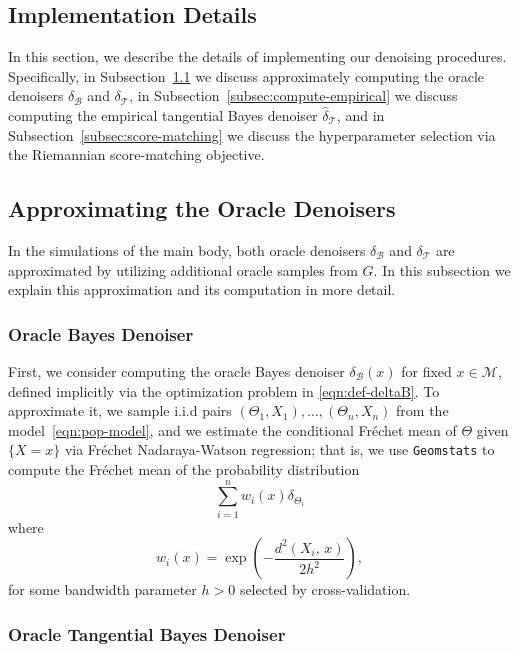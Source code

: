 \documentclass[preprint]{imsart}
\theoremstyle{plain}
\theoremstyle{definition}
\newcommand{\Mcal}{\mathcal{M}}
\newcommand{\B}{\mathcal{B}}
\newcommand{\T}{\mathcal{T}}
\begin{document}
\begin{appendix}
\section{Implementation Details}\label{app:implementation}

In this section, we describe the details of implementing our denoising procedures.
Specifically, in Subsection~\ref{subsec:compute-oracle} we discuss approximately computing the oracle denoisers $\delta_{\B}$ and $\delta_{\T}$, in Subsection~\ref{subsec:compute-empirical} we discuss computing the empirical tangential Bayes denoiser $\hat{\delta}_{\T}$, and in Subsection~\ref{subsec:score-matching} we discuss the hyperparameter selection via the Riemannian score-matching objective.


\subsection{Approximating the Oracle Denoisers}\label{subsec:compute-oracle}

In the simulations of the main body, both oracle denoisers $\delta_{\B}$ and $\delta_{\T}$ are approximated by utilizing additional oracle samples from $G$.
In this subsection we explain this approximation and its computation in more detail.

\subsubsection{Oracle Bayes Denoiser}

First, we consider computing the oracle Bayes denoiser $\delta_{\B}(x)$ for fixed $x\in\Mcal$, defined implicitly via the optimization problem in \eqref{eqn:def-deltaB}.
To approximate it, we sample i.i.d pairs $(\Theta_1,X_1),\ldots, (\Theta_n,X_n)$ from the model~\eqref{eqn:pop-model}, and we estimate the conditional Fr\'echet mean of $\Theta$ given $\{X=x\}$ via Fr\'echet Nadaraya-Watson regression; that is, we use \texttt{Geomstats} to compute the Fr\'echet mean of the probability distribution
\begin{equation*}
    \sum_{i=1}^{n}w_i(x)\delta_{\Theta_i}
\end{equation*}
where
\begin{equation}
w_i(x)
=
\exp\!\left(-\frac{d^2(X_i,\,x)}{2h^2}\right),
\end{equation}
for some bandwidth parameter $h>0$ selected by cross-validation.

\subsubsection{Oracle Tangential Bayes Denoiser}


\end{appendix}
\end{document}
